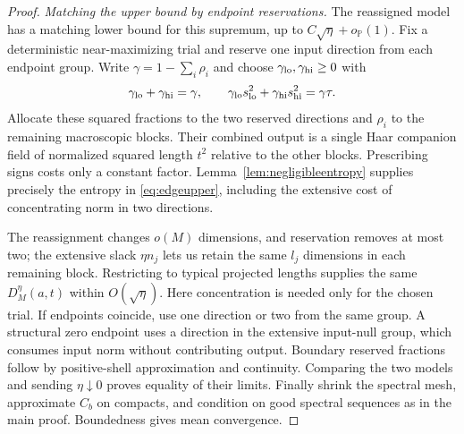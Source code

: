 \documentclass[11pt]{article}
\numberwithin{equation}{section}
\theoremstyle{definition}
\newcommand{\Pbb}{\mathbb P}
\begin{document}
\begin{proof}
\smallskip
\noindent\emph{Matching the upper bound by endpoint reservations.}
The reassigned model has a matching lower bound for this supremum, up to $C\sqrt\eta+o_{\Pbb}(1)$. Fix a deterministic near-maximizing trial and reserve one input direction from each endpoint group. Write $\gamma=1-\sum_i\rho_i$ and choose $\gamma_{\rm lo},\gamma_{\rm hi}\ge0$ with
\[
\gamma_{\rm lo}+\gamma_{\rm hi}=\gamma,\qquad
\gamma_{\rm lo}s_{\rm lo}^2+\gamma_{\rm hi}s_{\rm hi}^2=\gamma\tau.
\]
Allocate these squared fractions to the two reserved directions and $\rho_i$ to the remaining macroscopic blocks. Their combined output is a single Haar companion field of normalized squared length $t^2$ relative to the other blocks. Prescribing signs costs only a constant factor. Lemma~\ref{lem:negligibleentropy} supplies precisely the entropy in \eqref{eq:edgeupper}, including the extensive cost of concentrating norm in two directions.

The reassignment changes $o(M)$ dimensions, and reservation removes at most two; the extensive slack $\eta n_j$ lets us retain the same $l_j$ dimensions in each remaining block. Restricting to typical projected lengths supplies the same $D_M^\eta(a,t)$ within $O(\sqrt\eta)$. Here concentration is needed only for the chosen trial. If endpoints coincide, use one direction or two from the same group. A structural zero endpoint uses a direction in the extensive input-null group, which consumes input norm without contributing output. Boundary reserved fractions follow by positive-shell approximation and continuity. Comparing the two models and sending $\eta\downarrow0$ proves equality of their limits. Finally shrink the spectral mesh, approximate $C_b$ on compacts, and condition on good spectral sequences as in the main proof. Boundedness gives mean convergence.
\end{proof}
\end{document}
